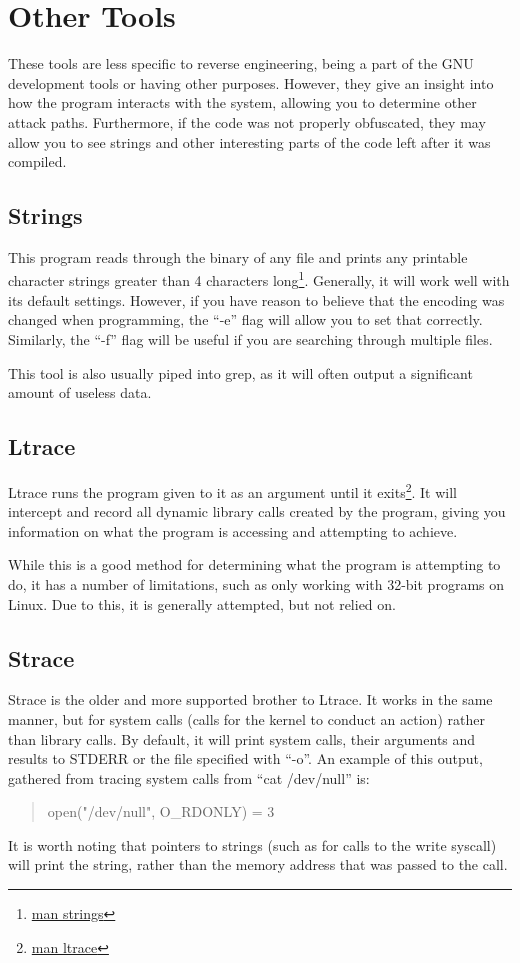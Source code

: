 	\section{Other Tools}
		These tools are less specific to reverse engineering, being a part of the GNU development tools or having other purposes. 
		However, they give an insight into how the program interacts with the system, allowing you to determine other attack paths. 
		Furthermore, if the code was not properly obfuscated, they may allow you to see strings and other interesting parts of the code left after it was compiled. 
		\subsection{Strings}
			This program reads through the binary of any file and prints any printable character strings greater than 4 characters long\footnote{\href{http://linuxcommand.org/man\_pages/strings1.html}{man strings}}.
			Generally, it will work well with its default settings. 
			However, if you have reason to believe that the encoding was changed when programming, the ``-e'' flag will allow you to set that correctly. 
			Similarly, the ``-f'' flag will be useful if you are searching through multiple files. 

			This tool is also usually piped into grep, as it will often output a significant amount of useless data. 
		\subsection{Ltrace}
			Ltrace runs the program given to it as an argument until it exits\footnote{\href{http://linuxcommand.org/man\_pages/ltrace1.html}{man ltrace}}.
			It will intercept and record all dynamic library calls created by the program, giving you information on what the program is accessing and attempting to achieve. 
		
			While this is a good method for determining what the program is attempting to do, it has a number of limitations, such as only working with 32-bit programs on Linux. 
			Due to this, it is generally attempted, but not relied on. 
		\subsection{Strace}
			Strace is the older and more supported brother to Ltrace. 
			It works in the same manner, but for system calls (calls for the kernel to conduct an action) rather than library calls. 
			By default, it will print system calls, their arguments and results to STDERR or the file specified with ``-o''. 
			An example of this output, gathered from tracing system calls from ``cat /dev/null'' is:
			\begin{quote}
				open("/dev/null", O\_RDONLY) = 3
			\end{quote}
			It is worth noting that pointers to strings (such as for calls to the write syscall) will print the string, rather than the memory address that was passed to the call. 

